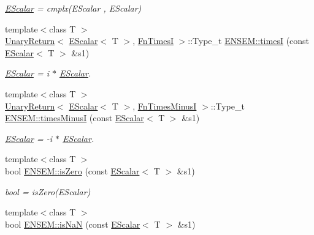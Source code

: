 \begin{DoxyCompactItemize}
\begin{DoxyCompactList}\small\item\em \mbox{\hyperlink{classENSEM_1_1EScalar}{E\+Scalar}} = cmplx(\+E\+Scalar , E\+Scalar) \end{DoxyCompactList}\item 
{\footnotesize template$<$class T $>$ }\\\mbox{\hyperlink{structENSEM_1_1UnaryReturn}{Unary\+Return}}$<$ \mbox{\hyperlink{classENSEM_1_1EScalar}{E\+Scalar}}$<$ T $>$, \mbox{\hyperlink{structENSEM_1_1FnTimesI}{Fn\+TimesI}} $>$\+::Type\+\_\+t \mbox{\hyperlink{group__escalar_gab216ba6f292c204a04e5ff6cd34c32c3}{E\+N\+S\+E\+M\+::timesI}} (const \mbox{\hyperlink{classENSEM_1_1EScalar}{E\+Scalar}}$<$ T $>$ \&s1)
\begin{DoxyCompactList}\small\item\em \mbox{\hyperlink{classENSEM_1_1EScalar}{E\+Scalar}} = i $\ast$ \mbox{\hyperlink{classENSEM_1_1EScalar}{E\+Scalar}}. \end{DoxyCompactList}\item 
{\footnotesize template$<$class T $>$ }\\\mbox{\hyperlink{structENSEM_1_1UnaryReturn}{Unary\+Return}}$<$ \mbox{\hyperlink{classENSEM_1_1EScalar}{E\+Scalar}}$<$ T $>$, \mbox{\hyperlink{structENSEM_1_1FnTimesMinusI}{Fn\+Times\+MinusI}} $>$\+::Type\+\_\+t \mbox{\hyperlink{group__escalar_gaf2675acd80a7a861cff22098e403837a}{E\+N\+S\+E\+M\+::times\+MinusI}} (const \mbox{\hyperlink{classENSEM_1_1EScalar}{E\+Scalar}}$<$ T $>$ \&s1)
\begin{DoxyCompactList}\small\item\em \mbox{\hyperlink{classENSEM_1_1EScalar}{E\+Scalar}} = -\/i $\ast$ \mbox{\hyperlink{classENSEM_1_1EScalar}{E\+Scalar}}. \end{DoxyCompactList}\item 
{\footnotesize template$<$class T $>$ }\\bool \mbox{\hyperlink{group__escalar_ga114fe2eec1be253ca86ecb5290d189fc}{E\+N\+S\+E\+M\+::is\+Zero}} (const \mbox{\hyperlink{classENSEM_1_1EScalar}{E\+Scalar}}$<$ T $>$ \&s1)
\begin{DoxyCompactList}\small\item\em bool = is\+Zero(\+E\+Scalar) \end{DoxyCompactList}\item 
{\footnotesize template$<$class T $>$ }\\bool \mbox{\hyperlink{group__escalar_gada6bc3d89f9c0b0dc55465bdcbb35a78}{E\+N\+S\+E\+M\+::is\+NaN}} (const \mbox{\hyperlink{classENSEM_1_1EScalar}{E\+Scalar}}$<$ T $>$ \&s1)

\end{DoxyCompactItemize}
